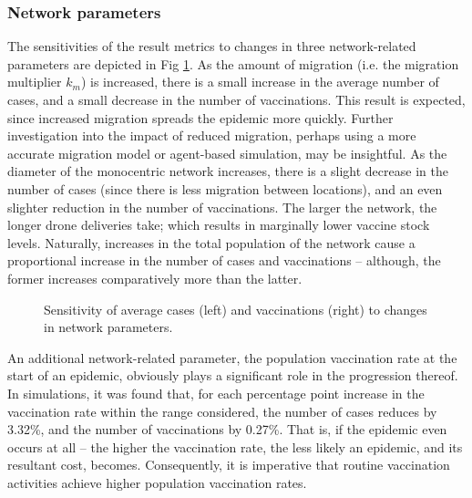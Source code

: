 \documentclass[10pt,letterpaper]{article}
\begin{document}
\subsubsection*{Network parameters}
The sensitivities of the result metrics to changes in three network-related parameters are depicted in Fig \ref{fig:sens_network}.
As the amount of migration (i.e. the migration multiplier $k_{m}$) is increased, there is a small increase in the average number of cases, and a small decrease in the number of vaccinations. This result is expected, since increased migration spreads the epidemic more quickly. Further investigation into the impact of reduced migration, perhaps using a more accurate migration model or agent-based simulation, may be insightful.
As the diameter of the monocentric network increases, there is a slight decrease in the number of cases (since there is less migration between locations), and an even slighter reduction in the number of vaccinations. The larger the network, the longer drone deliveries take; which results in marginally lower vaccine stock levels.
Naturally, increases in the total population of the network cause a proportional increase in the number of cases and vaccinations -- although, the former increases comparatively more than the latter.

\begin{figure}[ht!]
  \caption{Sensitivity of average cases (left) and vaccinations (right) to changes in network parameters.}
  \label{fig:sens_network}
\end{figure}

An additional network-related parameter, the population vaccination rate at the start of an epidemic, obviously plays a significant role in the progression thereof. In simulations, it was found that, for each percentage point increase in the vaccination rate within the range considered, the number of cases reduces by 3.32\%, and the number of vaccinations by 0.27\%. That is, if the epidemic even occurs at all -- the higher the vaccination rate, the less likely an epidemic, and its resultant cost, becomes. Consequently, it is imperative that routine vaccination activities achieve higher population vaccination rates.
\end{document}
